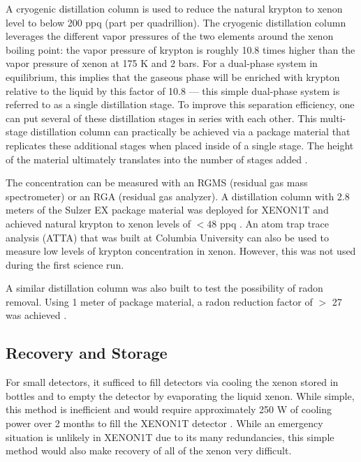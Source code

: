  A cryogenic distillation column is used to reduce the natural krypton to xenon level to below 200 ppq (part per quadrillion).  The cryogenic distillation column leverages the different vapor pressures of the two elements around the xenon boiling point: the vapor pressure of krypton is roughly 10.8 times higher than the vapor pressure of xenon at 175 K and 2 bars.  For a dual-phase system in equilibrium, this implies that the gaseous phase will be enriched with krypton relative to the liquid by this factor of 10.8 --- this simple dual-phase system is referred to as a single distillation stage.  To improve this separation efficiency, one can put several of these distillation stages in series with each other.  This multi-stage distillation column can practically be achieved via a package material that replicates these additional stages when placed inside of a single stage.  The height of the material ultimately translates into the number of stages added \cite{fieguth2016distillation}.
 
 The concentration can be measured with an RGMS (residual gas mass spectrometer) or an RGA (residual gas analyzer).  A distillation column with 2.8 meters of the Sulzer EX package material was deployed for XENON1T and achieved natural krypton to xenon levels of $< 48$ ppq \cite{aprile2017removing}.  An atom trap trace analysis (ATTA) that was built at Columbia University \cite{aprile2013atom} can also be used to measure low levels of krypton concentration in xenon.  However, this was not used during the first science run.
 
 A similar distillation column was also built to test the possibility of radon removal.  Using 1 meter of package material, a radon reduction factor of $>$ 27 was achieved \cite{aprile2017online}.
 
 
  \subsection{Recovery and Storage}
 
 For small detectors, it sufficed to fill detectors via cooling the xenon stored in bottles and to empty the detector by evaporating the liquid xenon.  While simple, this method is inefficient and would require approximately 250 W of cooling power over 2 months to fill the XENON1T detector \cite{aprile2017xenon1t}.  While an emergency situation is unlikely in XENON1T due to its many redundancies, this simple method would also make recovery of all of the xenon very difficult.
 
